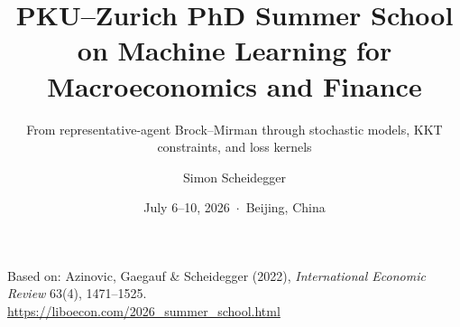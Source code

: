 \documentclass[aspectratio=169,11pt]{beamer}
\title[PKU--Zurich Summer School 2026]
{PKU--Zurich PhD Summer School on Machine Learning for Macroeconomics and Finance}
\subtitle{From representative-agent Brock--Mirman through stochastic models, KKT constraints, and loss kernels}
\author{Simon Scheidegger}
\institute{HEC Lausanne $\cdot$ University of Zurich}
\date{July 6--10, 2026 \,$\cdot$\, Beijing, China}
\begin{document}

{
\begin{frame}
\titlepage
\vspace{-0.4cm}
\begin{center}
{\footnotesize Based on: Azinovic, Gaegauf \& Scheidegger (2022), \emph{International Economic Review} 63(4), 1471--1525.}\\[8pt]
{\footnotesize \url{https://liboecon.com/2026_summer_school.html}}
\end{center}
\end{frame}
}

\end{document}
